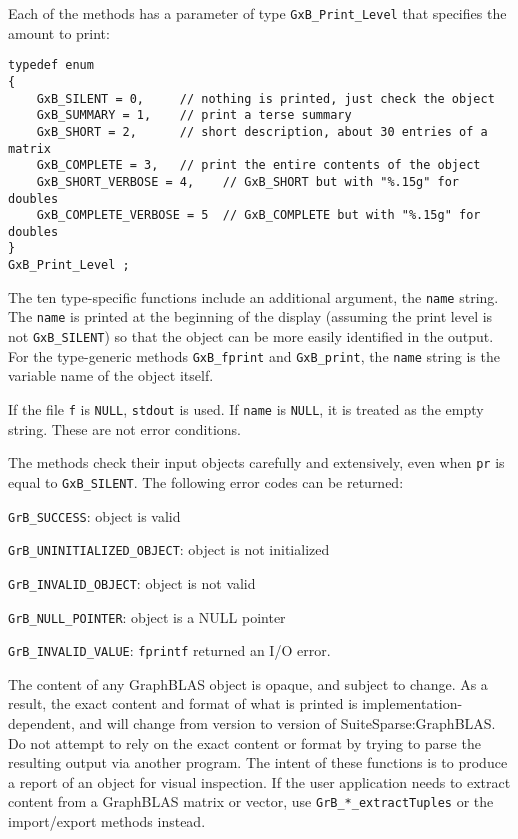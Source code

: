 \documentclass[12pt]{article}
\newenvironment{packed_itemize}{
\begin{itemize}
  \setlength{\itemsep}{1pt}
  \setlength{\parskip}{0pt}
  \setlength{\parsep}{0pt}
}{\end{itemize}}
\begin{document}
Each of the methods has a parameter of type \verb'GxB_Print_Level' that
specifies the amount to print:

{\footnotesize
\begin{verbatim}
typedef enum
{
    GxB_SILENT = 0,     // nothing is printed, just check the object
    GxB_SUMMARY = 1,    // print a terse summary
    GxB_SHORT = 2,      // short description, about 30 entries of a matrix
    GxB_COMPLETE = 3,   // print the entire contents of the object
    GxB_SHORT_VERBOSE = 4,    // GxB_SHORT but with "%.15g" for doubles
    GxB_COMPLETE_VERBOSE = 5  // GxB_COMPLETE but with "%.15g" for doubles
}
GxB_Print_Level ; \end{verbatim}}

The ten type-specific functions include an additional argument, the
\verb'name' string.  The \verb'name' is printed at the beginning of the display
(assuming the print level is not \verb'GxB_SILENT') so that the object can be
more easily identified in the output.  For the type-generic methods
\verb'GxB_fprint' and \verb'GxB_print', the \verb'name' string is the variable
name of the object itself.

If the file \verb'f' is \verb'NULL', \verb'stdout' is used.
If \verb'name' is \verb'NULL', it is treated
as the empty string.  These are not error conditions.

The methods check their input objects carefully and extensively, even when
\verb'pr' is equal to \verb'GxB_SILENT'.  The following error codes can be
returned:

\begin{packed_itemize}
\item \verb'GrB_SUCCESS':               object is valid
\item \verb'GrB_UNINITIALIZED_OBJECT':  object is not initialized
\item \verb'GrB_INVALID_OBJECT':        object is not valid
\item \verb'GrB_NULL_POINTER':          object is a NULL pointer
\item \verb'GrB_INVALID_VALUE':         \verb'fprintf' returned an I/O error.
\end{packed_itemize}

The content of any GraphBLAS object is opaque, and subject to change.  As a
result, the exact content and format of what is printed is
implementation-dependent, and will change from version to version of
SuiteSparse:GraphBLAS.  Do not attempt to rely on the exact content or format
by trying to parse the resulting output via another program.  The intent of
these functions is to produce a report of an object for visual inspection.  If
the user application needs to extract content from a GraphBLAS matrix or
vector, use \verb'GrB_*_extractTuples' or the import/export methods instead.
\end{document}
